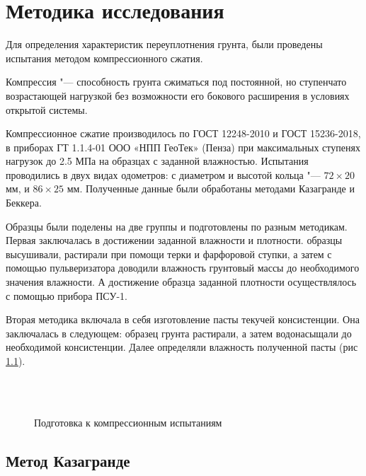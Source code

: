 \chapter{Методика исследования}

Для определения характеристик переуплотнения грунта, были проведены испытания методом компрессионного сжатия. 

Компрессия "--- способность грунта сжиматься под постоянной, но ступенчато возрастающей нагрузкой без возможности его бокового расширения в условиях открытой системы.

Компрессионное сжатие производилось по ГОСТ 12248-2010 и ГОСТ 15236-2018, в приборах ГТ 1.1.4-01 ООО «НПП ГеоТек» (Пенза) при максимальных ступенях нагрузок до 2.5 МПа на образцах с заданной влажностью. Испытания проводились в двух видах одометров: с диаметром и высотой кольца "--- $72 \times 20$ мм, и $86 \times 25$ мм.
Полученные данные были обработаны методами Казагранде и Беккера. 

 Образцы были поделены на две группы и подготовлены по разным методикам.
 Первая заключалась в достижении заданной влажности и плотности. образцы высушивали, растирали при помощи терки и фарфоровой ступки, а затем с помощью пульверизатора доводили влажность грунтовый массы до необходимого значения влажности. А достижение образца заданной плотности осуществлялось с помощью прибора ПСУ-1.

Вторая методика включала в себя изготовление пасты текучей консистенции. Она заключалась в следующем: образец грунта растирали, а затем водонасыщали до необходимой консистенции. Далее определяли влажность полученной пасты (рис \ref{eq:pst}).


\begin{figure}[ht]
    {\centering
         \hfill
        \\
        \\
    }
    \caption{Подготовка к компрессионным испытаниям}
    \label{eq:pst}
  \end{figure}

\section{Метод Казагранде}

